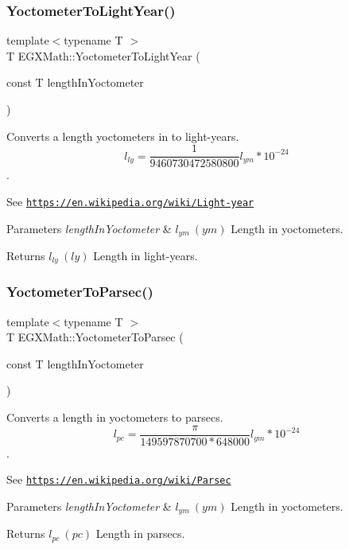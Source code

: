 \subsubsection{\texorpdfstring{Yoctometer\+To\+Light\+Year()}{YoctometerToLightYear()}}
{\footnotesize\ttfamily template$<$typename T $>$ \\
T E\+G\+X\+Math\+::\+Yoctometer\+To\+Light\+Year (\begin{DoxyParamCaption}\item[{const T}]{length\+In\+Yoctometer }\end{DoxyParamCaption})}



Converts a length yoctometers in to light-\/years. \[ l_{ly}= \frac{1}{9460730472580800} l_{ym} * 10^{-24} \]. 

See \href{https://en.wikipedia.org/wiki/Light-year}{\tt https\+://en.\+wikipedia.\+org/wiki/\+Light-\/year} 
\begin{DoxyParams}{Parameters}
{\em length\+In\+Yoctometer} & $ l_{ym}\ (ym)$ Length in yoctometers. \\
\hline
\end{DoxyParams}
\begin{DoxyReturn}{Returns}
$ l_{ly}\ (ly)$ Length in light-\/years. 
\end{DoxyReturn}
\mbox{\label{group___e_g_x_math-_conversions-_length_conversions-_yoctometer-_astronomical_ga6856c1dd6b2d31388b4138dcb03bd8ce}} 
\subsubsection{\texorpdfstring{Yoctometer\+To\+Parsec()}{YoctometerToParsec()}}
{\footnotesize\ttfamily template$<$typename T $>$ \\
T E\+G\+X\+Math\+::\+Yoctometer\+To\+Parsec (\begin{DoxyParamCaption}\item[{const T}]{length\+In\+Yoctometer }\end{DoxyParamCaption})}



Converts a length in yoctometers to parsecs. \[ l_{pc}=\frac{\pi}{149597870700 * 648000} l_{ym} * 10^{-24} \]. 

See \href{https://en.wikipedia.org/wiki/Parsec}{\tt https\+://en.\+wikipedia.\+org/wiki/\+Parsec} 
\begin{DoxyParams}{Parameters}
{\em length\+In\+Yoctometer} & $ l_{ym}\ (ym)$ Length in yoctometers. \\
\hline
\end{DoxyParams}
\begin{DoxyReturn}{Returns}
$ l_{pc}\ (pc)$ Length in parsecs. 
\end{DoxyReturn}
